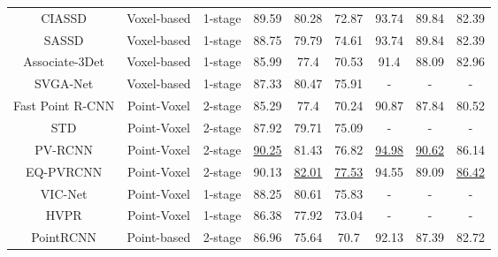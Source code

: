 \begin{table}
{\begin{tabular}{c|c|c|ccc|ccc}
		CIASSD \cite{zheng2021cia}                  & Voxel-based                & 1-stage               & 89.59          & 80.28          & 72.87          & 93.74          & 89.84          & 82.39           \\
		SASSD \cite{he2020structure}                   & Voxel-based                & 1-stage               & 88.75          & 79.79          & 74.61          & 93.74          & 89.84          & 82.39           \\
		Associate-3Det \cite{du2020associate}          & Voxel-based                & 1-stage               & 85.99          & 77.4           & 70.53          & 91.4           & 88.09          & 82.96           \\
		SVGA-Net \cite{he2022svga}                & Voxel-based                & 1-stage               & 87.33          & 80.47          & 75.91          & -              & -              & -               \\ 
		\hline
		Fast Point R-CNN \cite{chen2019fast}        & Point-Voxel                & 2-stage               & 85.29          & 77.4           & 70.24          & 90.87          & 87.84          & 80.52           \\
		STD \cite{yang2019std}                     & Point-Voxel                & 2-stage               & 87.92          & 79.71          & 75.09          & -              & -              & -               \\
		PV-RCNN \cite{shi2020pv}                 & Point-Voxel                & 2-stage               & \uline{90.25}  & 81.43          & 76.82          & \uline{94.98}  & \uline{90.62}  & 86.14           \\
		EQ-PVRCNN \cite{yang2022unified}               & Point-Voxel                & 2-stage               & 90.13          & \uline{82.01}  & \uline{77.53}  & 94.55          & 89.09          & \uline{86.42}   \\
		VIC-Net \cite{jiang2021vic}                 & Point-Voxel                & 1-stage               & 88.25          & 80.61          & 75.83          & -              & -              & -               \\
		HVPR \cite{noh2021hvpr}                    & Point-Voxel                & 1-stage               & 86.38          & 77.92          & 73.04          & -              & -              & -               \\ 
		\hline
		PointRCNN \cite{shi2019pointrcnn}               & Point-based                & 2-stage               & 86.96          & 75.64          & 70.7           & 92.13          & 87.39          & 82.72           \\

\end{tabular}}
\end{table}
